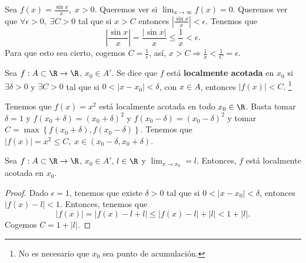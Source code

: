 \begin{eg}
\normalfont Sea $\displaystyle f\left(x\right) = \frac{\sin x}{x}, \; x > 0 $. Queremos ver si $\displaystyle \lim_{x \to \infty}f\left(x\right)=0 $. Queremos ver que $\displaystyle \forall\epsilon > 0, \; \exists C>0 $ tal que si $\displaystyle x > C $ entonces $\displaystyle \left|\frac{\sin x}{x}\right| < \epsilon  $. Tenemos que
\[ \left|\frac{\sin x}{x}\right| = \frac{ \left|\sin x\right|}{x} \leq \frac{1}{x} < \epsilon  .\]
Para que esto sea cierto, cogemos $\displaystyle C = \frac{1}{\epsilon } $, así, $\displaystyle x > C \Rightarrow \frac{1}{x} < \frac{1}{C} = \epsilon  $.
\end{eg}

\begin{fdefinition}
\normalfont Sea $\displaystyle f: A \subset \R \to \R $, $\displaystyle x_{0} \in A' $. Se dice que $\displaystyle f $ está \textbf{localmente acotada}  en $\displaystyle x_{0} $ si $\displaystyle \exists\delta>0 $ y $\displaystyle \exists C > 0 $ tal que si $\displaystyle 0 < \left|x -x_{0}\right|<\delta  $, con $\displaystyle x \in A $, entonces $\displaystyle \left|f\left(x\right)\right| < C $. \footnote{No es necesario que $\displaystyle x_{0} $ sea punto de acumulación.} 
\end{fdefinition}

\begin{eg}
	\normalfont Tenemos que $\displaystyle f\left(x\right) = x^{2} $ está localmente acotada en todo $\displaystyle x_{0} \in \R $. Basta tomar $\displaystyle \delta = 1 $ y $\displaystyle f\left(x_{0}+\delta \right) = \left(x_{0}+\delta \right)^{2} $ y $\displaystyle f\left(x_{0}-\delta \right)= \left(x_{0}- \delta \right)^{2} $ y tomar $\displaystyle C = \max \left\{ f\left(x_{0}+\delta \right), f\left(x_{0}-\delta \right)\right\}  $. Tenemos que $\displaystyle \left|f\left(x\right)\right| = x^{2} \leq C, \; x \in \left(x_{0}-\delta, x_{0}+\delta \right) $.
\end{eg}

\begin{ftheorem}[]
\normalfont Sea $\displaystyle f : A\subset\R \to \R $, $\displaystyle x_{0} \in A' $, $\displaystyle l \in \R $ y $\displaystyle \lim_{x \to x_{0}} = l $. Entonces, $\displaystyle f $ está localmente acotada en $\displaystyle x_{0} $.
\end{ftheorem}

\begin{proof}
Dado $\displaystyle \epsilon = 1 $, tenemos que existe $\displaystyle \delta > 0 $ tal que si $\displaystyle 0 < \left|x -x_{0}\right| < \delta  $, entonces $\displaystyle \left|f\left(x\right)-l\right|<1 $. Entonces, tenemos que 
\[ \left|f\left(x\right)\right| = \left|f\left(x\right)-l+l\right| \leq \left|f\left(x\right)-l\right| + \left|l\right| < 1 + \left|l\right| .\]
Cogemos $\displaystyle C = 1 + \left|l\right| $.
\end{proof}

